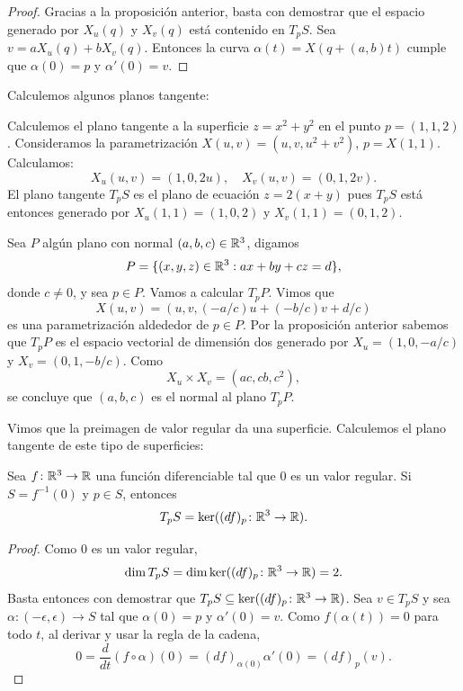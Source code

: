 \begin{proof}
	Gracias a la proposición anterior, basta con demostrar que el espacio generado por
	$X_u(q)$ y $X_v(q)$ está contenido en $T_pS$.  Sea
	$v=aX_u(q)+bX_v(q)$. Entonces  la curva $\alpha(t)=X(q+(a,b)t)$ cumple que $\alpha(0)=p$ y
	$\alpha'(0)=v$. 
\end{proof}

Calculemos algunos planos tangente:

\begin{example}
	\label{exa:TpS:z=x^2+y^2} 
	Calculemos el plano tangente a la superficie $z=x^2+y^2$ en el punto $p=(1,1,2)$. Consideramos
	la parametrización $X(u,v)=(u,v,u^2+v^2)$, $p=X(1,1)$. Calculamos:
	\[
		X_u(u,v)=(1,0,2u),\quad
		X_v(u,v)=(0,1,2v).
	\]
	El plano tangente $T_pS$ es el plano de ecuación $z=2(x+y)$ pues $T_pS$
	está entonces generado por $X_u(1,1)=(1,0,2)$ y $X_v(1,1)=(0,1,2)$. 
\end{example}

\begin{example}
	Sea $P$ algún plano con normal $(a,b,c)\in\mathbb{R}^3$, digamos
	\[
		P=\{(x,y,z)\in\mathbb{R}^3:ax+by+cz=d\},
	\]
	donde $c\ne 0$, y sea 
	$p\in P$. Vamos a calcular $T_pP$. Vimos que
	\[
		X(u,v)=\left(u,v,(-a/c)u+(-b/c)v+d/c\right)
	\]
	es una parametrización aldededor de $p\in P$. Por la proposición anterior
	sabemos que $T_pP$ es el espacio vectorial de dimensión dos generado por
	$X_u=(1,0,-a/c)$ y $X_v=(0,1,-b/c)$. Como 
	\[
		X_u\times X_v=(ac,cb,c^2),
	\]
	se concluye que $(a,b,c)$ es el normal al plano $T_pP$. 
\end{example}

Vimos que la preimagen de valor regular da una superficie. Calculemos el plano
tangente de este tipo de superficies:

\begin{proposition}
	Sea $f\colon\mathbb{R}^3\to\mathbb{R}$ una función diferenciable tal que $0$ es un valor regular.
	Si $S=f^{-1}(0)$ y $p\in S$, entonces 
	\[
		T_pS=\ker((df)_p\colon\mathbb{R}^3\to\mathbb{R}).
	\]
\end{proposition}

\begin{proof}
	Como $0$ es un valor regular, 
	\[
		\dim T_pS=\dim\ker((df)_p\colon\mathbb{R}^3\to\mathbb{R})=2.
	\]
	Basta entonces con demostrar que $T_pS\subseteq\ker( (df)_p\colon\mathbb{R}^3\to\mathbb{R})$.
	Sea $v\in T_pS$ y sea $\alpha\colon(-\epsilon,\epsilon)\to S$ tal que
	$\alpha(0)=p$ y $\alpha'(0)=v$. Como $f(\alpha(t))=0$ para todo $t$, al
	derivar y usar la regla de la cadena, 
	\[
		0=\frac{d}{dt}(f\circ\alpha)(0)=(df)_{\alpha(0)}\alpha'(0)=(df)_p(v).
	\]
\end{proof}


